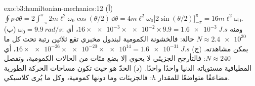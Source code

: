 \begin{solution}{exo:b3:hamiltonian-mechanics:12}
(أ) $\oint p\,\dd\theta = 2\int_{-\pi}^{\pi}2m\ell^2\omega_0
\cos(\theta/2)\,\dd\theta = 4m\ell^2\omega_0\big[2\sin(\theta/2)
\big]_{-\pi}^{\pi} = 16m\ell^2\omega_0$. (ب) $\omega_0 =
\qty{9.9}{rad/s}$: ومنه $16 \times \num{e-3} \times \num{e-2} \times 9.9 =
\qty{1.6e-3}{J.s}$، أي $N \approx \num{2.4e30}$ حالة: فالخشونة
الكمومية لبندول مخبري تقع ثلاثين رتبة تحت كل ما يمكن مشاهدته.
(ج) $16 \times \num{e-26} \times
\num{e-20} \times \num{e14} = \qty{1.6e-31}{J.s}$، أي $N \approx
240$: فالتأرجح الجزيئي لا يحوي إلا بضع مئات من الحالات الكمومية،
وتفصل المطيافية مستوياته الدنيا واحدًا واحدًا. (د) الحدّ
هو حيث تكون مساحات الحركة الطورية مضاعفًا متواضعًا للمقدار
$h$: فالجزيئات وما دونها كمومية، وكل ما يُرى كلاسيكي.
\end{solution}

